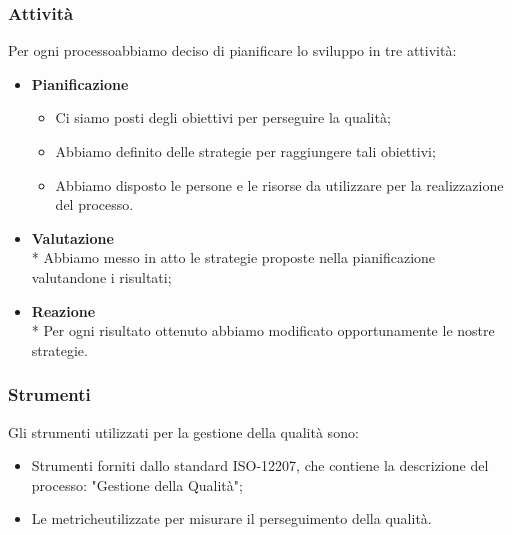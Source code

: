 \subsubsection{Attività}
Per ogni processo\glosp abbiamo deciso di pianificare lo sviluppo in tre attività:
\begin{itemize}
	\item \textbf{Pianificazione}
		\begin{itemize}
			\item Ci siamo posti degli obiettivi per perseguire la qualità;
			\item Abbiamo definito delle strategie per raggiungere tali obiettivi;
			\item Abbiamo disposto le persone e le risorse da utilizzare per la realizzazione del processo\glo.
		\end{itemize}
	\item \textbf{Valutazione} \\*
		Abbiamo messo in atto le strategie proposte nella pianificazione valutandone i risultati;
	\item \textbf{Reazione} \\*
		Per ogni risultato ottenuto abbiamo modificato opportunamente le nostre strategie.
\end{itemize}
\subsubsection{Strumenti}
Gli strumenti utilizzati per la gestione della qualità sono:
\begin{itemize}
	\item Strumenti forniti dallo standard ISO-12207, che contiene la descrizione del processo\glo: "Gestione della Qualità";
	\item Le metriche\glosp utilizzate per misurare il perseguimento della qualità.
\end{itemize}
